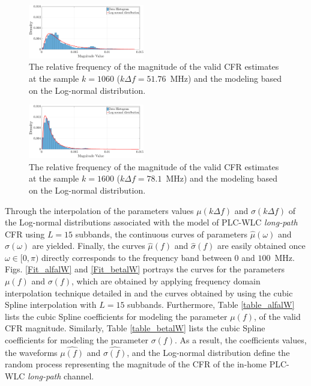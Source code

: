 \documentclass[journal]{IEEEtran}
\begin{document}
\begin{figure}[h!]
	\centering
	\includegraphics[width=0.45\textwidth]{images/Mag_histlW_2.eps}
	\caption{The relative frequency of the magnitude of the valid CFR estimates at the sample $k = 1060$ ($k\Delta f= 51.76$~MHz) and the modeling based on the Log-normal distribution.}
	\label{mag_examplelW}
\end{figure}

\begin{figure}[h!]
	\centering
	\includegraphics[width=0.45\textwidth]{images/Mag_hist2lW_2.eps}
	\caption{ The relative frequency of the magnitude of the valid CFR estimates at the sample $k = 1600$ ($k\Delta f= 78.1$~MHz) and the modeling based on the Log-normal distribution.}
	\label{mag_example2lW}
\end{figure}

Through the interpolation of the parameters values $\mu(k\Delta f)$ and $\sigma(k\Delta f)$ of the Log-normal distributions associated with the model of \ac{PLC}-\ac{WLC} \textit{long-path} \ac{CFR} using $L=15$ subbands, the continuous curves of parameters $\hat{\mu}(\omega)$ and $\hat{\sigma}(\omega)$ are yielded. Finally, the curves $\hat{\mu}(f)$ and $\hat{\sigma}(f)$ are easily obtained once $\omega \in [0,\pi)$ directly corresponds to the frequency band between $0$ and $100$~MHz. Figs. \ref{Fit_alfalW} and \ref{Fit_betalW} portrays the curves for the parameters $\mu(f)$ and $\sigma(f)$, which are obtained by applying frequency domain interpolation technique detailed in \cite{mitra} and the curves obtained by using the cubic Spline interpolation with $L=15$ subbands. Furthermore, Table \ref{table_alfalW} lists the cubic Spline coefficients for modeling the parameter $\mu(f)$, of the valid \ac{CFR} magnitude. Similarly, Table \ref{table_betalW} lists the cubic Spline coefficients for modeling the parameter $\sigma(f)$. As a result, the coefficients values, the waveforms  $\hat{\mu(f)}$ and $\hat{\sigma(f)}$, and the Log-normal distribution define the random process representing the magnitude of the \ac{CFR} of the in-home \ac{PLC}-\ac{WLC} \textit{long-path} channel.
\end{document}
